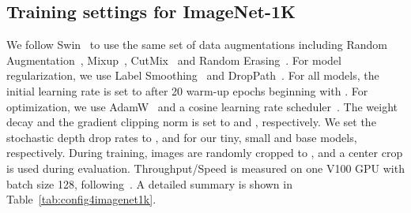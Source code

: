 \documentclass{article}
\begin{document}
\begin{table}[h]
    \centering
{}
    \captionsetup{font=footnotesize}  
    \caption{Model configurations at four stages for FocalNet. The depth layouts and hidden dimension () are the same to Swin~\cite{liu2021swin} and Focal Transformers~\cite{yang2021focal}. SRF and LRF means small and large receptive field, respectively. The only difference is the number of focal levels () and starting kernel size (). The last column lists the effective receptive field at top focal level at each stage ().}
    \label{tab:focalnet_variants}
    \vspace{-3mm}
\end{table}

\subsection{Training settings for ImageNet-1K} 
We follow Swin~\cite{liu2021swin} to use the same set of data augmentations including Random Augmentation~\cite{cubuk2020randaugment}, Mixup~\cite{zhang2017mixup}, CutMix~\cite{yun2019cutmix} and Random Erasing~\cite{zhong2020random}. For model regularization, we use Label Smoothing~\cite{szegedy2016rethinking} and DropPath~\cite{huang2016deep}. For all models, the initial learning rate is set to  after 20 warm-up epochs beginning with . For optimization, we use AdamW~\cite{loshchilov2017decoupled} and a cosine learning rate scheduler~\cite{loshchilov2016sgdr}. The weight decay and the gradient clipping norm is set to  and , respectively. We set the stochastic depth drop rates to ,  and  for our tiny, small and base models, respectively. During training, images are randomly cropped to , and a center crop is used during evaluation. Throughput/Speed is measured on one V100 GPU with batch size 128, following~\cite{liu2021swin}. A detailed summary is shown in Table~\ref{tab:config4imagenet1k}.
\end{document}
